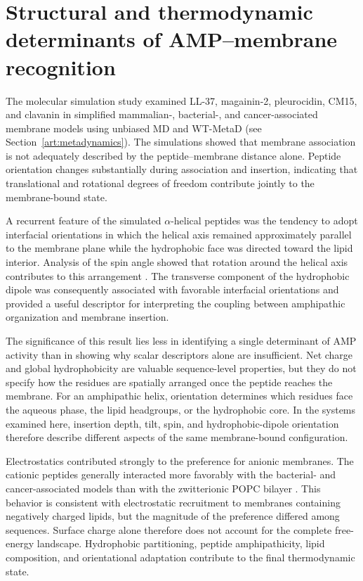 \section{Structural and thermodynamic determinants of AMP–membrane recognition}

The molecular simulation study examined LL-37, magainin-2, pleurocidin, CM15, and clavanin in simplified mammalian-, bacterial-, and cancer-associated membrane models using unbiased MD and WT-MetaD \cite{DANI_METADINAMICA} (see Section~\ref{art:metadynamics}). The simulations showed that membrane association is not adequately described by the peptide--membrane distance alone. Peptide orientation changes substantially during association and insertion, indicating that translational and rotational degrees of freedom contribute jointly to the membrane-bound state.

A recurrent feature of the simulated $\alpha$-helical peptides was the tendency to adopt interfacial orientations in which the helical axis remained approximately parallel to the membrane plane while the hydrophobic face was directed toward the lipid interior. Analysis of the spin angle showed that rotation around the helical axis contributes to this arrangement \cite{DANI_METADINAMICA}. The transverse component of the hydrophobic dipole was consequently associated with favorable interfacial orientations and provided a useful descriptor for interpreting the coupling between amphipathic organization and membrane insertion.

The significance of this result lies less in identifying a single determinant of AMP activity than in showing why scalar descriptors alone are insufficient. Net charge and global hydrophobicity are valuable sequence-level properties, but they do not specify how the residues are spatially arranged once the peptide reaches the membrane. For an amphipathic helix, orientation determines which residues face the aqueous phase, the lipid headgroups, or the hydrophobic core. In the systems examined here, insertion depth, tilt, spin, and hydrophobic-dipole orientation therefore describe different aspects of the same membrane-bound configuration.

Electrostatics contributed strongly to the preference for anionic membranes. The cationic peptides generally interacted more favorably with the bacterial- and cancer-associated models than with the zwitterionic POPC bilayer \cite{DANI_METADINAMICA}. This behavior is consistent with electrostatic recruitment to membranes containing negatively charged lipids, but the magnitude of the preference differed among sequences. Surface charge alone therefore does not account for the complete free-energy landscape. Hydrophobic partitioning, peptide amphipathicity, lipid composition, and orientational adaptation contribute to the final thermodynamic state.

